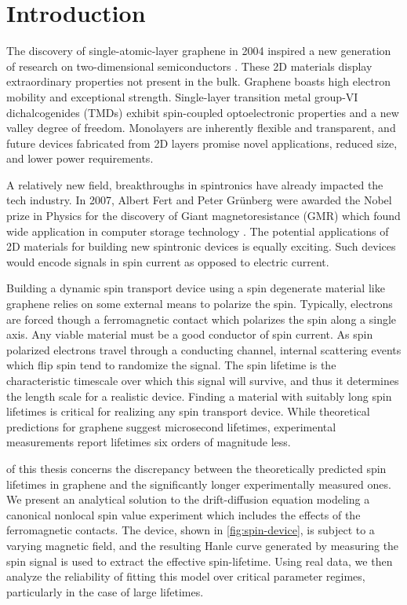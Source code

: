 \chapter{Introduction}

The discovery of single-atomic-layer graphene in 2004
inspired a new generation of research on two-dimensional semiconductors
\cite{Novoselov666}.
These 2D materials display extraordinary properties not present in the bulk.
Graphene boasts high electron mobility and exceptional strength.
Single-layer transition metal group-VI dichalcogenides (TMDs)
exhibit spin-coupled optoelectronic properties
and a new valley degree of freedom.
Monolayers are inherently flexible and transparent,
and future devices fabricated from 2D layers promise
novel applications, reduced size, and lower power requirements.

A relatively new field, breakthroughs in spintronics
have already impacted the tech industry.
In 2007, Albert Fert and Peter Grünberg were awarded
the Nobel prize in Physics for the discovery of
Giant magnetoresistance (GMR)
which found wide application in computer storage technology
\cite{PhysRevB.39.4828}.
The potential applications of 2D materials for
building new spintronic devices is equally exciting.
Such devices would encode signals in spin current
as opposed to electric current.

Building a dynamic spin transport device using a
spin degenerate material like graphene
relies on some external means to polarize the spin.
Typically, electrons are forced though a ferromagnetic contact
which polarizes the spin along a single axis.
Any viable material must be a good conductor of spin current.
As spin polarized electrons travel through a conducting channel,
internal scattering events which flip spin tend to randomize the signal.
The spin lifetime is the characteristic timescale
over which this signal will survive,
and thus it determines the length scale for a realistic device.
Finding a material with suitably long spin lifetimes
is critical for realizing any spin transport device.
While theoretical predictions for graphene suggest microsecond lifetimes,
experimental measurements report lifetimes six orders of magnitude less.

 of this thesis
concerns the discrepancy
between the theoretically predicted spin lifetimes in graphene
and the significantly longer experimentally measured ones.
We present an analytical solution to the drift-diffusion equation
modeling a canonical nonlocal spin value experiment which
includes the effects of the ferromagnetic contacts.
The device, shown in \cref{fig:spin-device},
is subject to a varying magnetic field,
and the resulting Hanle curve generated by measuring the spin signal
is used to extract the effective spin-lifetime.
Using real data, we then analyze the reliability of fitting this model
over critical parameter regimes, particularly in the case of large lifetimes.

